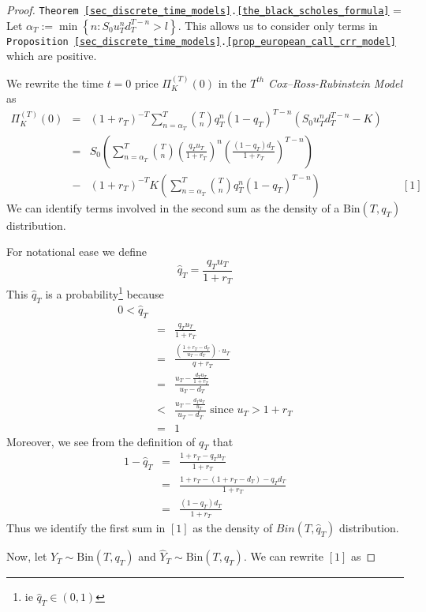 \documentclass[11pt,a4paper]{article}
\begin{document}
  \begin{proof}{\texttt{Theorem  \ref{sec_discrete_time_models}.\ref{the_black_scholes_formula}}}
    \everymath={\displaystyle}
    Let $\alpha_T:=\min\left\{n:S_0u_T^nd_T^{T-n}>l\right\}$. This allows us to consider only terms in \texttt{Proposition \ref{sec_discrete_time_models}.\ref{prop_european_call_crr_model}} which are positive.
    \par We rewrite the time $t=0$ price $\Pi_K^{(T)}(0)$ in the $T^{th}$ \textit{Cox--Ross-Rubinstein Model} as
    \[\begin{array}{rcll}
      \Pi_K^{(T)}(0)&=&(1+r_T)^{-T}\sum_{n=\alpha_T}^T{T \choose n}q_T^n(1-q_T)^{T-n}(S_0u_T^nd_T^{T-n}-K)\\
      &=&S_0\left(\sum_{n=\alpha_T}^T{T\choose n}\left(\frac{q_Tu_T}{1+r_T}\right)^n\left(\frac{(1-q_T)d_T}{1+r_T}\right)^{T-n}\right)\\
      &-&(1+r_T)^{-T}K\left(\sum_{n=\alpha_T}^T{T\choose n}q_T^n(1-q_T)^{T-n}\right)&\quad[1]
    \end{array}\]
    We can identify terms involved in the second sum as the density of a $\text{Bin}(T,q_T)$ distribution.
    \par For notational ease we define
    \[ \hat{q}_T=\frac{q_Tu_T}{1+r_T} \]
    This $\hat{q}_T$ is a probability\footnote{ie $\hat{q}_T\in(0,1)$} because
    \[\begin{array}{rcl}
      0<\hat{q}_T\\
      &=&\frac{q_Tu_T}{1+r_T}\\
      &=&\frac{\left(\frac{1+r_T-d_T}{u_T-d_T}\right)\cdot u_T}{q+r_T}\\
      &=&\frac{u_T-\frac{d_Tu_T}{1+r_T}}{u_T-d_T}\\
      &<&\frac{u_T-\frac{d_Tu_T}{u_T}}{u_T-d_T}\text{ since }u_T>1+r_T\\
      &=&1
    \end{array}\]
    Moreover, we see from the definition of $q_T$ that
    \[\begin{array}{rcl}
      1-\hat{q}_T&=&\frac{1+r_T-q_Tu_T}{1+r_T}\\
      &=&\frac{1+r_T-(1+r_T-d_T)-q_Td_T}{1+r_T}\\
      &=&\frac{(1-q_T)d_T}{1+r_T}
    \end{array}\]
    Thus we identify the first sum in $[1]$ as the density of $Bin(T,\hat{q}_T)$ distribution.
    \par Now, let $Y_T\sim\text{Bin}(T,q_T)$ and $\hat{Y}_T\sim\text{Bin}(T,\hat{q}_T)$. We can rewrite $[1]$ as

\end{proof}
\end{document}
